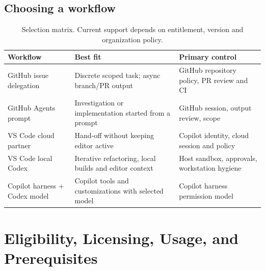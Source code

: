 \documentclass[11pt,letterpaper,oneside]{article}
\begin{document}
\subsection{Choosing a workflow}
\begin{table}[htbp]
\small
\centering
\begin{tabularx}{\linewidth}{@{}>{\raggedright\arraybackslash}p{2.7cm}Y Y@{}}
\toprule
\textbf{Workflow} & \textbf{Best fit} & \textbf{Primary control}\tabularnewline\midrule
GitHub issue delegation & Discrete scoped task; async branch/PR output & GitHub repository policy, PR review and CI\\
GitHub Agents prompt & Investigation or implementation started from a prompt & GitHub session, output review, scope\\
VS Code cloud partner & Hand-off without keeping editor active & Copilot identity, cloud session and policy\\
VS Code local Codex & Iterative refactoring, local builds and editor context & Host sandbox, approvals, workstation hygiene\\
Copilot harness + Codex model & Copilot tools and customizations with selected model & Copilot harness permission model\\
\bottomrule
\end{tabularx}
\caption{Selection matrix. Current support depends on entitlement, version and organization policy.}
\end{table}

\section{Eligibility, Licensing, Usage, and Prerequisites}
\end{document}
